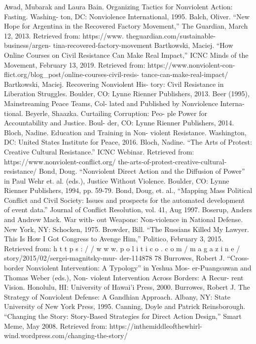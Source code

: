 \documentclass[twoside,a4paper,12pt,fleqn,openany]{extbook}
\begin{document}
Awad, Mubarak and Laura Bain. Organizing
Tactics for Nonviolent Action: Fasting. Washing-
ton, DC: Nonviolence International, 1995.
Balch, Oliver. “New Hope for Argentina in the
Recovered Factory Movement,” The Guardian,
March 12, 2013. Retrieved from: https://www.
theguardian.com/sustainable-business/argen-
tina-recovered-factory-movement
Bartkowski, Maciej. “How Online Courses on
Civil Resistance Can Make Real Impact,” ICNC
Minds of the Movement, February 13, 2019.
Retrieved from: https://www.nonviolent-con-
flict.org/blog_post/online-courses-civil-resis-
tance-can-make-real-impact/
Bartkowski, Maciej. Recovering Nonviolent His-
tory: Civil Resistance in Liberation Struggles.
Boulder, CO: Lynne Rienner Publishers, 2013.
Beer (1995), Mainstreaming Peace Teams, Col-
lated and Published by Nonviolence Interna-
tional.
Beyerle, Shaazka. Curtailing Corruption: Peo-
ple Power for Accountability and Justice. Boul-
der, CO: Lynne Rienner Publishers, 2014.
Bloch, Nadine. Education and Training in Non-
violent Resistance. Washington, DC: United
States Institute for Peace, 2016.
Bloch, Nadine. “The Arts of Protest: Creative
Cultural Resistance.” ICNC Webinar. Retrieved
from: https://www.nonviolent-conflict.org/
the-arts-of-protest-creative-cultural-resistance/
Bond, Doug. “Nonviolent Direct Action and the
Diffusion of Power” in Paul Wehr et. al. (eds.),
Justice Without Violence. Boulder, CO: Lynne
Rienner Publishers, 1994, pp. 59-79.
Bond, Doug, et. al., “Mapping Mass Political
Conflict and Civil Society: Issues and prospects
for the automated development of event data.”
Journal of Conflict Resolution, vol. 41, Aug 1997.
Boserup, Anders and Andrew Mack. War with-
out Weapons: Non-violence in National
Defense. New York, NY: Schocken, 1975.
Browder, Bill. “The Russians Killed My Lawyer.
This Is How I Got Congress to Avenge Him,”
Politico, February 3, 2015. Retrieved from:
h t t p s : / / w w w. p o l i t i c o . c o m / m a g a z i n e /
story/2015/02/sergei-magnitsky-mur-
der-114878
78
Burrowes, Robert J. “Cross-border Nonviolent
Intervention: A Typology” in Yeshua Mos-
er-Puangsuwan and Thomas Weber (eds.), Non-
violent Intervention Across Borders: A Recur-
rent Vision. Honolulu, HI: University of Hawai’i
Press, 2000.
Burrowes, Robert J. The Strategy of Nonviolent
Defense: A Gandhian Approach. Albany, NY:
State University of New York Press, 1995.
Canning, Doyle and Patrick Reinsborough.
“Changing the Story: Story-Based Strategies for
Direct Action Design,” Smart Meme, May 2008.
Retrieved from: https://inthemiddleofthewhirl-
wind.wordpress.com/changing-the-story/
\end{document}
